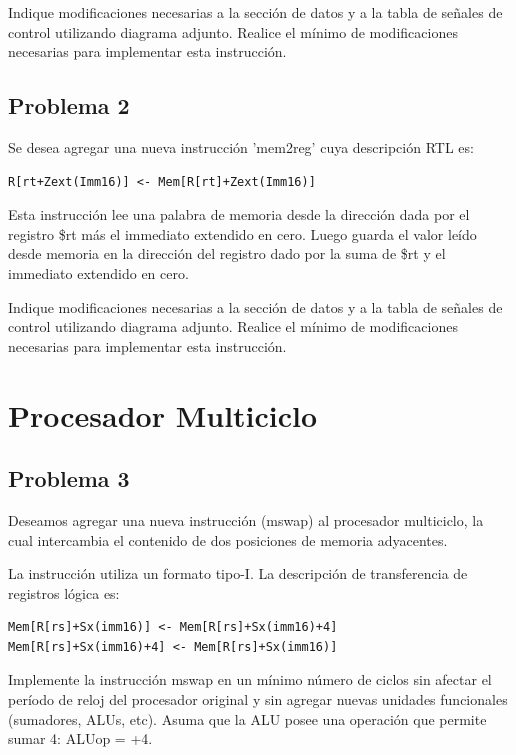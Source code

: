 \documentclass[letterpaper,11pt,notitlepage]{article}
\begin{document}
Indique modificaciones necesarias a la sección de datos y a la tabla de señales de control utilizando diagrama adjunto. Realice el mínimo de modificaciones necesarias para implementar esta instrucción.

\subsection*{Problema 2}

Se desea agregar una nueva instrucción 'mem2reg' cuya descripción RTL es:

\begin{lstlisting}[style=C]
R[rt+Zext(Imm16)] <- Mem[R[rt]+Zext(Imm16)]
\end{lstlisting}

Esta instrucción lee una palabra de memoria desde la dirección dada por el registro \$rt más el immediato extendido en cero. Luego guarda el valor leído desde memoria en la dirección del registro dado por la suma de \$rt y el immediato extendido en cero.

Indique modificaciones necesarias a la sección de datos y a la tabla de señales de control utilizando diagrama adjunto. Realice el mínimo de modificaciones necesarias para implementar esta instrucción.

\newpage

\section*{Procesador Multiciclo}
\subsection*{Problema 3}

Deseamos agregar una nueva instrucción (mswap) al procesador multiciclo, la cual intercambia el contenido de dos posiciones de memoria adyacentes. 

La instrucción utiliza un formato tipo-I. La descripción de transferencia de registros lógica es:

\begin{lstlisting}[style=C]
Mem[R[rs]+Sx(imm16)] <- Mem[R[rs]+Sx(imm16)+4]
Mem[R[rs]+Sx(imm16)+4] <- Mem[R[rs]+Sx(imm16)]
\end{lstlisting}

Implemente la instrucción mswap en un mínimo número de ciclos sin afectar el período de reloj del procesador original y sin agregar nuevas unidades funcionales (sumadores, ALUs, etc). Asuma que la ALU posee una operación que permite sumar 4: ALUop = +4.
\end{document}
